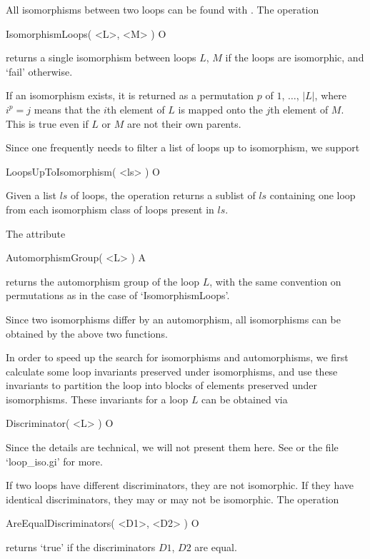 
All isomorphisms between two loops can be found with {\LOOPS}. The operation

\>IsomorphismLoops( <L>, <M> ) O

returns a single isomorphism between loops $L$, $M$ if the loops are
isomorphic, and `fail' otherwise.

If an isomorphism exists, it is returned as a permutation $p$ of $1$, $\dots$,
$|L|$, where $i^p=j$ means that the $i$th element of $L$ is mapped onto the
$j$th element of $M$. This is true even if $L$ or $M$ are not their own
parents.

Since one frequently needs to filter a list of loops up to isomorphism, we
support

\>LoopsUpToIsomorphism( <ls> ) O

Given a list $ls$ of loops, the operation returns a sublist of $ls$ containing
one loop from each isomorphism class of loops present in $ls$.

The attribute

\>AutomorphismGroup( <L> ) A

returns the automorphism group of the loop $L$, with the same convention on
permutations as in the case of `IsomorphismLoops'.

Since two isomorphisms differ by an automorphism, all isomorphisms can be
obtained by the above two functions.


In order to speed up the search for isomorphisms and automorphisms, we first
calculate some loop invariants preserved under isomorphisms, and use these
invariants to partition the loop into blocks of elements preserved under
isomorphisms. These invariants for a loop $L$ can be obtained via

\>Discriminator( <L> ) O

Since the details are technical, we will not present them here. See
\cite{VoEJC} or the file `loop_iso.gi' for more.

If two loops have different discriminators, they are not isomorphic. If they
have identical discriminators, they may or may not be isomorphic. The operation

\>AreEqualDiscriminators( <D1>, <D2> ) O

returns `true' if the discriminators $D1$, $D2$ are equal.
